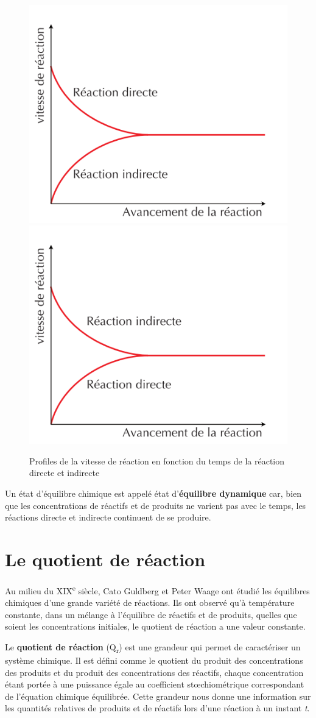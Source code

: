 \documentclass[
  11pt,
  a4paper,
  openany]{book}
\begin{document}
\begin{figure}

{\centering \includegraphics[width=0.33\linewidth]{images/equilibres-vitesses-1a} \includegraphics[width=0.33\linewidth]{images/equilibres-vitesses-1b} 

}

\caption{Profiles de la vitesse de réaction en fonction du temps de la réaction directe et indirecte}\label{fig:equilibres-vitesses-1}
\end{figure}

Un état d'équilibre chimique est appelé état d'\textbf{équilibre dynamique} car, bien que les concentrations de réactifs et de produits ne varient pas avec le temps, les réactions directe et indirecte continuent de se produire.

\hypertarget{le-quotient-de-ruxe9action}{%
\section{Le quotient de réaction}\label{le-quotient-de-ruxe9action}}

Au milieu du XIX\textsuperscript{e} siècle, Cato Guldberg et Peter Waage ont étudié les équilibres chimiques d'une grande variété de réactions. Ils ont observé qu'à température constante, dans un mélange à l'équilibre de réactifs et de produits, quelles que soient les concentrations initiales, le quotient de réaction a une valeur constante.

Le \textbf{quotient de réaction} (Q\textsubscript{r}) est une grandeur qui permet de caractériser un système chimique. Il est défini comme le quotient du produit des concentrations des produits et du produit des concentrations des réactifs, chaque concentration étant portée à une puissance égale au coefficient stœchiométrique correspondant de l'équation chimique équilibrée. Cette grandeur nous donne une information sur les quantités relatives de produits et de réactifs lors d'une réaction à un instant \emph{t}.
\end{document}
